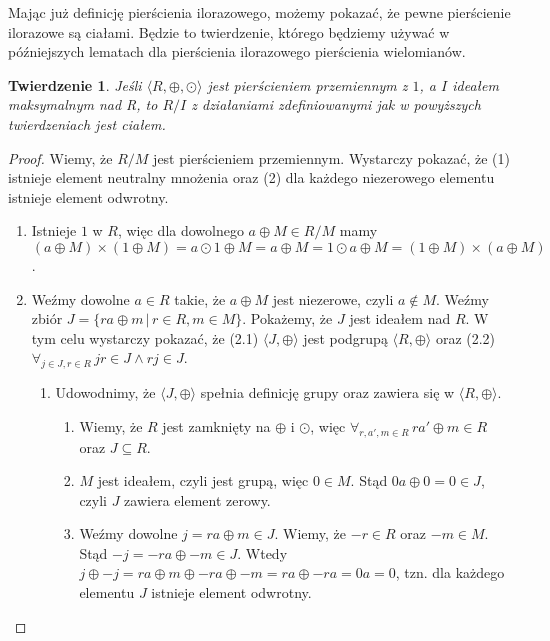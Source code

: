 \documentclass[polish,declaration,shortabstract]{iithesis}
\theoremstyle{definition}
\theoremstyle{remark} \newtheorem{observation}{Obserwacja}
\theoremstyle{plain} \newtheorem{theorem}{Twierdzenie}
\theoremstyle{plain} \newtheorem{lemma}{Lemat}
\theoremstyle{remark} \newtheorem*{remark*}{Uwaga}
\theoremstyle{reminder} \newtheorem*{reminder*}{Przypomnienie}
\begin{document}
Mając już definicję pierścienia ilorazowego, możemy pokazać, że pewne pierścienie ilorazowe są ciałami. Będzie to twierdzenie, którego będziemy używać w późniejszych lematach dla pierścienia ilorazowego pierścienia wielomianów.

\theoremstyle{theorem}
\begin{theorem}\label{pier_ilo_cialem0}
	Jeśli $\langle R, \oplus, \odot \rangle$ jest pierścieniem przemiennym z $1$, a $I$ ideałem maksymalnym nad R, to $R/I$ z działaniami zdefiniowanymi jak w powyższych twierdzeniach jest ciałem.
\end{theorem}

\begin{proof}
	Wiemy, że $R/M$ jest pierścieniem przemiennym. Wystarczy pokazać, że (1) istnieje element neutralny mnożenia oraz (2) dla każdego niezerowego elementu istnieje element odwrotny.
	\begin{enumerate}[label=(\arabic*),leftmargin=.4in]
		\item Istnieje $1$ w $R$, więc dla dowolnego $a \oplus M \in R/M$ mamy
		      $(a \oplus M) \times (1 \oplus M) = a \odot 1 \oplus M = a \oplus M = 1 \odot a \oplus M = (1 \oplus M) \times (a \oplus M)$.
		\item Weźmy dowolne $a \in R$ takie, że $a \oplus M$ jest niezerowe, czyli $a \notin M$. Weźmy zbiór $J = \{ra \oplus m \, | \, r \in R, m \in M\}$. Pokażemy, że $J$ jest ideałem nad $R$. W tym celu wystarczy pokazać, że (2.1) $\langle J, \oplus \rangle$ jest podgrupą $\langle R, \oplus \rangle$ oraz (2.2)$\forall_{j \in J, r \in R} \, jr \in J \wedge rj \in J$.
		      \begin{enumerate}[label=(2.\arabic*)]
		      	\item Udowodnimy, że $\langle J, \oplus \rangle$ spełnia definicję grupy oraz zawiera się w $\langle R, \oplus \rangle$.
		      	      \begin{enumerate}[label=(2.1.\arabic*)]
		      	      	\item Wiemy, że $R$ jest zamknięty na $\oplus$ i $\odot$, więc $\forall_{r, a', m \in R} \, ra' \oplus m \in R$ oraz $J \subseteq R$. 
		      	      	\item $M$ jest ideałem, czyli jest grupą, więc $0 \in M$. Stąd $0a \oplus 0 = 0 \in J$, czyli $J$ zawiera element zerowy.
		      	      	\item Weźmy dowolne $j = ra \oplus m \in J$. Wiemy, że $-r \in R$ oraz $-m \in M$. Stąd $-j = -ra \oplus -m \in J$. Wtedy $j \oplus -j = ra \oplus m \oplus -ra \oplus -m = ra \oplus -ra = 0a = 0$, tzn. dla każdego elementu $J$ istnieje element odwrotny.

\end{enumerate}
\end{enumerate}
\end{enumerate}
\end{proof}
\end{document}
